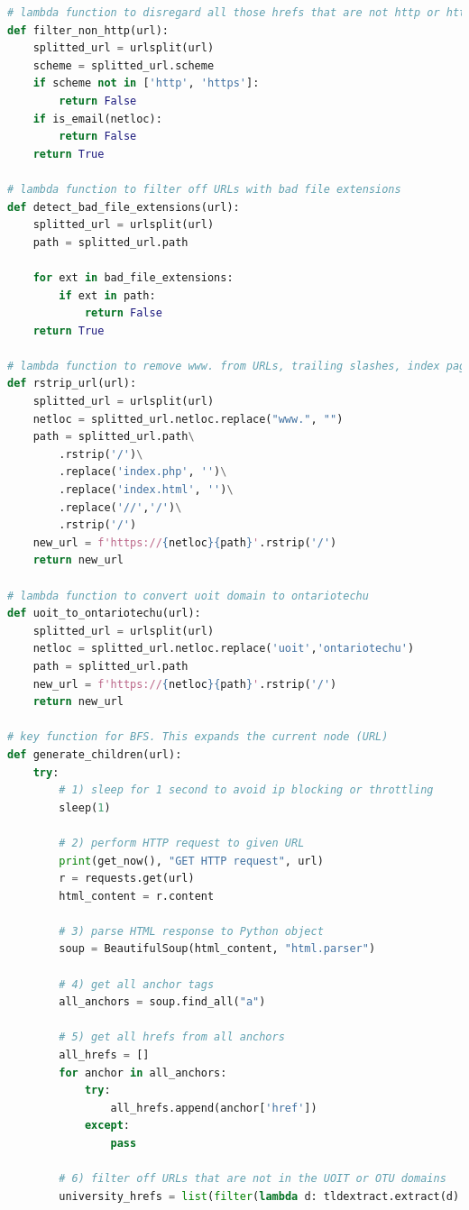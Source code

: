 \begin{lstlisting}[language=Python]
# lambda function to disregard all those hrefs that are not http or https pages, e.g. mailto
def filter_non_http(url):
    splitted_url = urlsplit(url)
    scheme = splitted_url.scheme
    if scheme not in ['http', 'https']:
        return False
    if is_email(netloc):
        return False
    return True

# lambda function to filter off URLs with bad file extensions
def detect_bad_file_extensions(url):
    splitted_url = urlsplit(url)
    path = splitted_url.path

    for ext in bad_file_extensions:
        if ext in path:
            return False
    return True

# lambda function to remove www. from URLs, trailing slashes, index pages and double slashes.
def rstrip_url(url):
    splitted_url = urlsplit(url)
    netloc = splitted_url.netloc.replace("www.", "")
    path = splitted_url.path\
        .rstrip('/')\
        .replace('index.php', '')\
        .replace('index.html', '')\
        .replace('//','/')\
        .rstrip('/')
    new_url = f'https://{netloc}{path}'.rstrip('/')
    return new_url

# lambda function to convert uoit domain to ontariotechu
def uoit_to_ontariotechu(url):
    splitted_url = urlsplit(url)
    netloc = splitted_url.netloc.replace('uoit','ontariotechu')
    path = splitted_url.path
    new_url = f'https://{netloc}{path}'.rstrip('/')
    return new_url

# key function for BFS. This expands the current node (URL)
def generate_children(url):
    try:
        # 1) sleep for 1 second to avoid ip blocking or throttling
        sleep(1)
        
        # 2) perform HTTP request to given URL
        print(get_now(), "GET HTTP request", url)
        r = requests.get(url)
        html_content = r.content

        # 3) parse HTML response to Python object
        soup = BeautifulSoup(html_content, "html.parser")

        # 4) get all anchor tags
        all_anchors = soup.find_all("a")
        
        # 5) get all hrefs from all anchors
        all_hrefs = []
        for anchor in all_anchors:
            try:
                all_hrefs.append(anchor['href'])
            except:
                pass

        # 6) filter off URLs that are not in the UOIT or OTU domains
        university_hrefs = list(filter(lambda d: tldextract.extract(d).domain in university_domains, all_hrefs))


\end{lstlisting}
